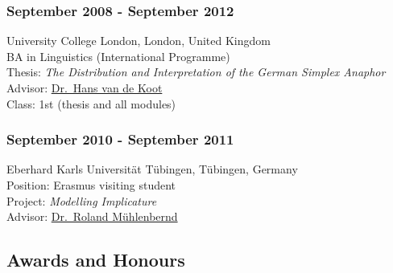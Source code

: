 \documentclass[]{article}
\begin{document}
\subsubsection{September 2008 - September
2012}\label{september-2008---september-2012}

University College London, London, United Kingdom\\
BA in Linguistics (International Programme)\\
Thesis: \emph{The Distribution and Interpretation of the German Simplex
Anaphor}\\
Advisor:
\href{https://www.ucl.ac.uk/pals/people/profiles/academic-staff/hans-van-de-koot}{Dr.~Hans
van de Koot}\\
Class: 1st (thesis and all modules)

\subsubsection{September 2010 - September
2011}\label{september-2010---september-2011}

Eberhard Karls Universität Tübingen, Tübingen, Germany\\
Position: Erasmus visiting student\\
Project: \emph{Modelling Implicature}\\
Advisor: \href{http://www.sfs.uni-tubeingen.de/~roland/}{Dr.~Roland
Mühlenbernd}

\subsection{Awards and Honours}\label{awards-and-honours}
\end{document}
